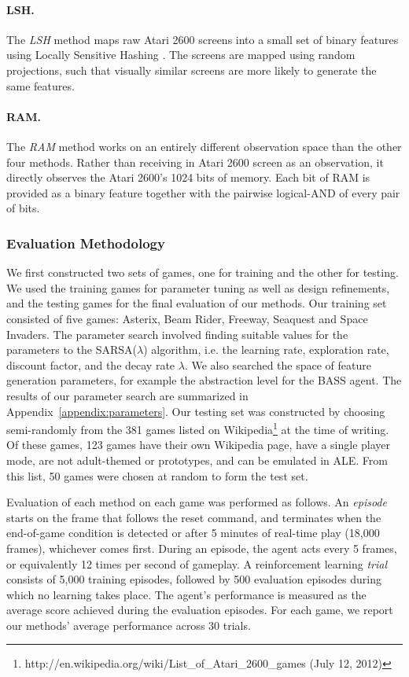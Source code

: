 \documentclass[twoside,11pt]{article}
\newcommand{\gamename}[1]{{\sc #1}}
\begin{document}
\paragraph{LSH.} The \emph{LSH} method maps raw Atari 2600 screens into a small set of binary features
using Locally Sensitive Hashing \cite{gionis_99}. The screens are mapped using random 
projections, such that visually similar screens are more likely to generate the same features.

\paragraph{RAM.} The \emph{RAM} method works on an entirely different observation space than the other four methods.  Rather than receiving in Atari 2600 screen as an observation, it directly observes the Atari 2600's 1024 bits of memory.  
Each bit of RAM is provided as a binary feature together with the pairwise logical-AND of every pair of bits.

\subsubsection{Evaluation Methodology}
\label{sec:RL:experimental_setup}

We first constructed two sets of games, one for training and the other for testing. 
We used the training games for parameter tuning as well as design refinements, and the testing games for the final evaluation of our methods.
Our training set consisted of five games: \gamename{Asterix}, \gamename{Beam Rider}, \gamename{Freeway}, \gamename{Seaquest} and \gamename{Space Invaders}. 
The parameter search involved finding suitable values for the parameters to the SARSA($\lambda$) algorithm, i.e. the learning rate, exploration rate, discount factor, and the decay rate $\lambda$. 
We also searched the space of feature generation parameters, for example the abstraction level for the BASS agent. 
The results of our parameter search are summarized in Appendix~\ref{appendix:parameters}.
Our testing set was constructed by choosing semi-randomly from the 381 games listed on Wikipedia\footnote{http://en.wikipedia.org/wiki/List\_of\_Atari\_2600\_games (July 12, 2012)} at the time of writing. 
Of these games, 123 games have their own Wikipedia page, have a single player mode, are not adult-themed or prototypes, and can be emulated in ALE. From this list,
50 games were chosen at random to form the test set.

Evaluation of each method on each game was performed as follows.
An \emph{episode} starts on the frame that follows the reset command, and terminates when the end-of-game condition is detected or after 5 minutes of real-time play (18,000 frames), whichever comes first. 
During an episode, the agent acts every 5 frames, or equivalently 12 times per second of gameplay. 
A reinforcement learning \emph{trial} consists of 5,000 training episodes, followed by 500 evaluation episodes during which no learning takes place. 
The agent's performance is measured as the average score achieved during the evaluation episodes. 
For each game, we report our methods' average performance across 30 trials. 
\end{document}
